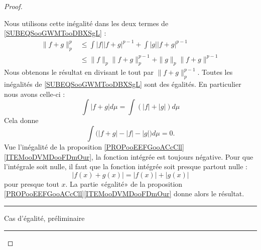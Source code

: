 \begin{proof}
\begin{subproof}
		Nous utilisons cette inégalité dans les deux termes de \eqref{SUBEQSooGWMTooDBXSgL} :
		\begin{subequations}		\label{SUBEQSooKHKOooOCfndf}
			\begin{align}
				\| f+g \|_p^p & \leq \int | f || f+g |^{p-1}+\int | g || f+g |^{p-1}     \\
				              & \leq \| f \|_p\| f+g \|_p^{p-1}+\| g \|_p\| f+g \|^{p-1}
			\end{align}
		\end{subequations}
		Nous obtenons le résultat en divisant le tout par \( \| f+g \|_p^{p-1}\).
		Toutes les inégalités de \eqref{SUBEQSooGWMTooDBXSgL} sont des égalités. En particulier nous avons celle-ci :
		\begin{equation}
			\int | f+g |d\mu=\int(| f |+| g |)d\mu
		\end{equation}
		Cela donne
		\begin{equation}
			\int\big( | f+g |-| f |-|g| \big)d\mu=0.
		\end{equation}
		Vue l'inégalité de la proposition \ref{PROPooEEFGooACcCll}\ref{ITEMooDVMDooFDmOur}, la fonction intégrée est toujours négative. Pour que l'intégrale soit nulle, il faut que la fonction intégrée soit presque partout nulle :
		\begin{equation}
			| f(x)+g(x) |=| f(x) |+| g(x) |
		\end{equation}
		pour presque tout \( x\). La partie «égalité» de la proposition \ref{PROPooEEFGooACcCll}\ref{ITEMooDVMDooFDmOur} donne alors le résultat.
	\end{subproof}

	\begin{center}
		\noindent\rule{2cm}{0.4pt}
		Cas d'égalité, préliminaire
		\noindent\rule{2cm}{0.4pt}
	\end{center}


\end{proof}
